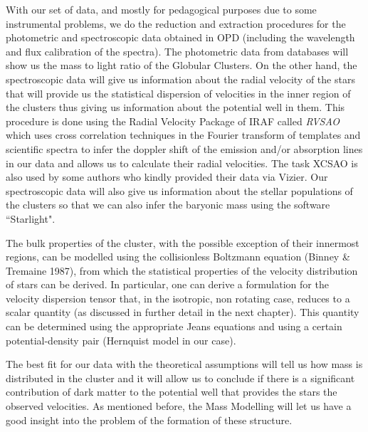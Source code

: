 With our set of data, and mostly for pedagogical purposes due to some instrumental problems, we do the reduction and extraction procedures for the photometric and spectroscopic data obtained in OPD (including the wavelength and flux calibration of the spectra). The photometric data from databases will show us the mass to light ratio of the Globular Clusters. On the other hand, the spectroscopic data will give us information about the radial velocity of the stars that will provide us the statistical dispersion of velocities in the inner region of the clusters thus giving us information about the potential well in them.  This procedure is done using the Radial Velocity Package of IRAF called \textit{RVSAO} which uses cross correlation techniques in the Fourier transform of templates and scientific spectra to infer the doppler shift of the emission and/or absorption lines in our data and allows us to calculate their radial velocities. The task XCSAO is also used by some authors who kindly provided their data via Vizier. Our spectroscopic data will also give us information about the stellar populations of the clusters so that we can also infer the baryonic mass using the software ``Starlight". 

The bulk properties of the cluster, with the possible exception of their innermost regions, can be modelled using the collisionless Boltzmann equation (Binney \& Tremaine 1987), from which the statistical properties of the velocity distribution of stars can be derived. In particular, one can derive a formulation for the velocity dispersion tensor that, in the isotropic, non rotating case, reduces to a scalar quantity (as discussed in further detail in the next chapter). This quantity can be determined using the appropriate Jeans equations and using a certain potential-density pair (Hernquist model in our case).

The best fit for our data with the theoretical assumptions will tell us how mass is distributed in the cluster and it will allow us to conclude if there is a significant contribution of dark matter to the potential well that provides the stars the observed velocities. As mentioned before, the Mass Modelling will let us have a good insight into the problem of the formation of these structure.

\begin{center}
$\:$
\end{center}

\begin{center}
$\:$
\end{center}

\begin{center}
$\:$
\end{center}

\newpage
